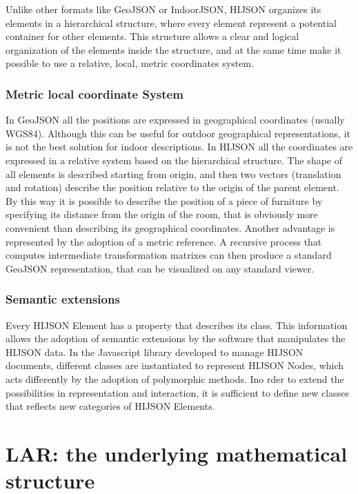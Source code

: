 \documentclass[]{article}
\begin{document}
Unlike other formats like GeoJSON or IndoorJSON, HIJSON organizes its
elements in a hierarchical structure, where every element represent a
potential container for other elements. This structure allows a clear
and logical organization of the elements inside the structure, and at
the same time make it possible to use a relative, local, metric
coordinates system.

\subsubsection{Metric local coordinate
System}\label{metric-local-coordinate-system}

In GeoJSON all the positions are expressed in geographical coordinates
(usually WGS84). Although this can be useful for outdoor geographical
representations, it is not the best solution for indoor descriptions. In
HIJSON all the coordinates are expressed in a relative system based on
the hierarchical structure. The shape of all elements is described
starting from origin, and then two vectors (translation and rotation)
describe the position relative to the origin of the parent element. By
this way it is possible to describe the position of a piece of furniture
by specifying its distance from the origin of the room, that is
obviously more convenient than describing its geographical coordinates.
Another advantage is represented by the adoption of a metric reference.
A recursive process that computes intermediate transformation matrixes
can then produce a standard GeoJSON representation, that can be
visualized on any standard viewer.

\subsubsection{Semantic extensions}\label{semantic-extensions}

Every HIJSON Element has a property that describes its class. This
information allows the adoption of semantic extensions by the software
that manipulates the HIJSON data. In the Javascript library developed to
manage HIJSON documents, different classes are instantiated to represent
HIJSON Nodes, which acts differently by the adoption of polymorphic
methods. Ino rder to extend the possibilities in representation and
interaction, it is sufficient to define new classes that reflects new
categories of HIJSON Elements.

\section{LAR: the underlying mathematical
structure}\label{lar-the-underlying-mathematical-structure}
\end{document}
